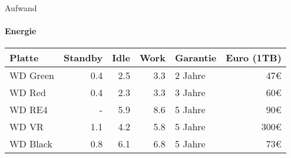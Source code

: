 \begin{frame}{Aufwand}
\framesubtitle{Energie}
\begin{tabular}{|l|r|r|r|l|r|}
\hline
\textbf{Platte}   & \textbf{Standby} & \textbf{Idle} & \textbf{Work} & \textbf{Garantie} & \textbf{Euro (1TB)} \\
\hline
WD Green &     0.4 &  2.5 &  3.3 & 2 Jahre  &        47€ \\
\hline
WD Red   &     0.4 &  2.3 &  3.3 & 3 Jahre  &        60€ \\
\hline
WD RE4   &       - &  5.9 &  8.6 & 5 Jahre  &        90€ \\
\hline
WD VR    &     1.1 &  4.2 &  5.8 & 5 Jahre  &       300€ \\
\hline
WD Black &     0.8 &  6.1 &  6.8 & 5 Jahre  &        73€ \\
\hline
\end{tabular}
\end{frame}
